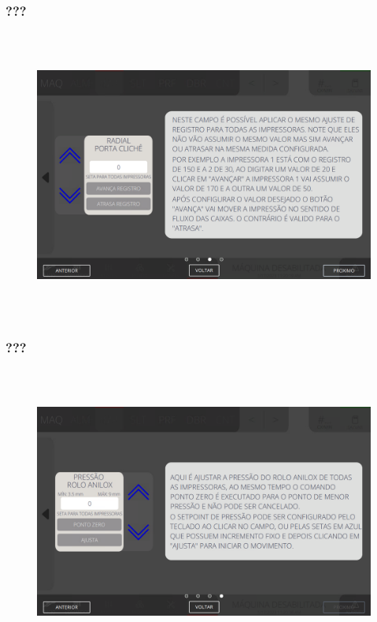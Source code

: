 \newpage
\thispagestyle{fancy}
\vspace*{\fill}
\subsubsection{\small{???}}
\begin{figure}[h]
  \centering
  \includegraphics[width=576px,height=360px]{src/imagesFlexo/04-printter/01-printters/settings/e-11.png}
   \label{}
\end{figure}
\vspace*{\fill}

\newpage
\thispagestyle{fancy}
\vspace*{\fill}
\subsubsection{\small{???}}
\begin{figure}[h]
  \centering
  \includegraphics[width=576px,height=360px]{src/imagesFlexo/04-printter/01-printters/settings/e-12.png}
   \label{}
\end{figure}
\vspace*{\fill}
